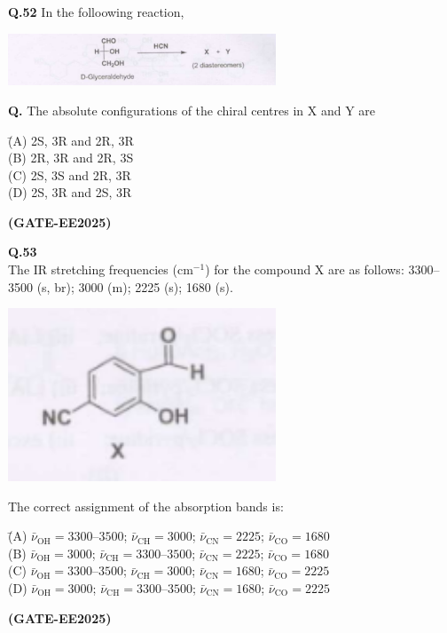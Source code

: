 \documentclass[12pt]{article}
\begin{document}
\begin{enumerate}
\vspace{0.5cm}

\textbf{Q.52} In the folloowing reaction,

\begin{center}
\includegraphics[width=0.6\textwidth]{figs/q52.png}
\end{center}

\textbf{Q.} The absolute configurations of the chiral centres in X and Y are

\begin{tabbing}
\hspace{1cm} \= (A) \quad 2S, 3R \quad and \quad 2R, 3R \\
\> (B) \quad 2R, 3R \quad and \quad 2R, 3S \\
\> (C) \quad 2S, 3S \quad and \quad 2R, 3R \\
\> (D) \quad 2S, 3R \quad and \quad 2S, 3R
\end{tabbing}   \textbf{(GATE-EE2025)}


\textbf{Q.53} \\
The IR stretching frequencies (cm$^{-1}$) for the compound X are as follows: 3300--3500 (s, br); 3000 (m); 2225 (s); 1680 (s). \\

\begin{center}
\includegraphics[width=0.6\textwidth]{figs/q53.png}
\end{center}

The correct assignment of the absorption bands is:

\begin{tabbing}
\hspace{1cm} \= (A) \quad $\bar{\nu}_{\text{OH}} = 3300$--$3500$; $\bar{\nu}_{\text{CH}} = 3000$; $\bar{\nu}_{\text{CN}} = 2225$; $\bar{\nu}_{\text{CO}} = 1680$ \\
\> (B) \quad $\bar{\nu}_{\text{OH}} = 3000$; $\bar{\nu}_{\text{CH}} = 3300$--$3500$; $\bar{\nu}_{\text{CN}} = 2225$; $\bar{\nu}_{\text{CO}} = 1680$ \\
\> (C) \quad $\bar{\nu}_{\text{OH}} = 3300$--$3500$; $\bar{\nu}_{\text{CH}} = 3000$; $\bar{\nu}_{\text{CN}} = 1680$; $\bar{\nu}_{\text{CO}} = 2225$ \\
\> (D) \quad $\bar{\nu}_{\text{OH}} = 3000$; $\bar{\nu}_{\text{CH}} = 3300$--$3500$; $\bar{\nu}_{\text{CN}} = 1680$; $\bar{\nu}_{\text{CO}} = 2225$
\end{tabbing}   \textbf{(GATE-EE2025)}



\end{enumerate}
\end{document}
